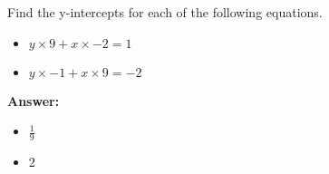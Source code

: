  Find the y-intercepts for each of the following equations. \begin{itemize}\item \( y \times 9 + x \times -2 = 1 \)\item \( y \times -1 + x \times 9 = -2 \)\end{itemize}

        \textbf{Answer:} \begin{itemize}\item \( \frac{1}{9} \)\item \( 2 \)\end{itemize}
